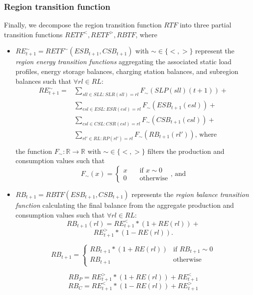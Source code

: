 \subsubsection{Region transition function}
\label{transitions_regions}

Finally, we decompose the region transition function $RTF$ into three partial transition functions $RETF^<,RETF^>,RBTF$, where
\begin{itemize}
	\item $RE_{t+1}^\sim = RETF^\sim(ESB_{t+1}, CSB_{t+1})$ with $\sim \in \{<,>\}$ represent the \textit{region energy transition functions} aggregating the associated static load profiles, energy storage balances, charging station balances, and subregion balances such that $\forall rl \in RL:$
		\begin{equation*}
		\begin{split}
		RE_{t+1}^\sim = & \sum_{sll \in SLL: SLR(sll) = rl} F_\sim(SLP(sll)(t+1)) + \\
		& \sum_{esl \in ESL: ESR(esl) = rl} F_\sim(ESB_{t+1}(esl)) + \\
		& \sum_{csl \in CSL: CSR(csl) = rl} F_\sim(CSB_{t+1}(csl)) + \\
		& \sum_{rl' \in RL: RP(rl') = rl} F_\sim(RB_{t+1}(rl')) \textrm{, where} \\
		\end{split}
		\end{equation*}
	the function $F_\sim: \mathbb{R} \rightarrow \mathbb{R}$ with $\sim \in \{<,>\}$ filters the production and consumption values such that
	\[
		F_\sim(x) = \begin{cases}
			x & \quad \textrm{if } x \sim 0 \\
			0 & \quad \textrm{otherwise}
		\end{cases}
		\textrm{, and}
	\]
	\item $RB_{t+1} = RBTF(ESB_{t+1}, CSB_{t+1})$ represents the \textit{region balance transition function} calculating the final balance from the aggregate production and consumption values such that $\forall rl \in RL:$
	\[
		RB_{t+1}(rl) = RE_{t+1}^< * (1 + RE(rl)) +
	\]
	\[
		RE_{t+1}^> * (1 - RE(rl)) \textrm{.}
	\]
	
	\[
		RB_{t+1} = \begin{cases}
		RB_{t+1} * (1 + RE(rl)) & \textrm{if } RB_{t+1} \sim 0 \\
		RB_{t+1} & \textrm{otherwise}
		\end{cases}
	\]
	
	\[
		RB_P =	RE_{t+1}^> * (1 + RE(rl)) + RE_{t+1}^< 
	\]	
	\[
		RB_C =	RE_{t+1}^< * (1 - RE(rl)) + RE_{t+1}^> 
	\]	
\end{itemize}
